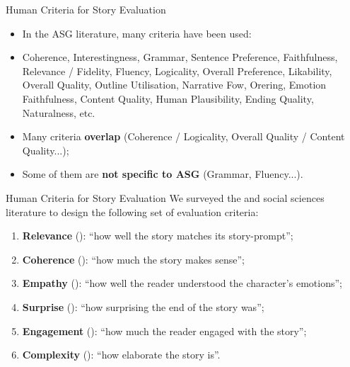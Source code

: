 \begin{frame}{Human Criteria for Story Evaluation}
    \begin{itemize}[<+->]
        \item In the ASG literature, many criteria have been used:
        \item Coherence, Interestingness, Grammar, Sentence Preference, Faithfulness, Relevance / Fidelity, Fluency, Logicality, Overall Preference, Likability, Overall Quality, Outline Utilisation, Narrative Fow, Orering, Emotion Faithfulness, Content Quality, Human Plausibility, Ending Quality, Naturalness, etc.
        \item Many criteria \textbf{overlap} (Coherence / Logicality, Overall Quality / Content Quality...);
        \item Some of them are \textbf{not specific to ASG} (Grammar, Fluency...).
    \end{itemize}

\end{frame}

\begin{frame}{Human Criteria for Story Evaluation}
    We surveyed the {\asg} and social sciences literature to design the following set of evaluation criteria:
    \begin{enumerate}[<+(1)->]
        \item \textbf{Relevance} (\myre): ``how well the story matches its story-prompt'';
        \item \textbf{Coherence} (\mych): ``how much the story makes sense'';
        \item \textbf{Empathy} (\myem): ``how well the reader understood the character’s emotions'';
        \item \textbf{Surprise} (\mysu): ``how surprising the end of the story was'';
        \item \textbf{Engagement} (\myeg): ``how much the reader engaged with the story''; 
        \item \textbf{Complexity} (\mycx): ``how elaborate the story is''.
    \end{enumerate}
\end{frame}

